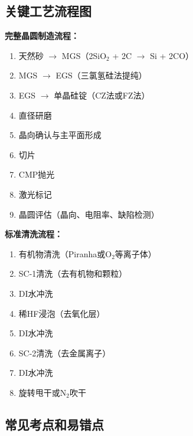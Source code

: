 \documentclass[UTF8,12pt,a4paper]{ctexart}
\begin{document}
\subsection{关键工艺流程图}

\textbf{完整晶圆制造流程：}
\begin{enumerate}
    \item 天然砂 $\rightarrow$ MGS（2SiO$_2$ + 2C $\rightarrow$ Si + 2CO）
    \item MGS $\rightarrow$ EGS（三氯氢硅法提纯）
    \item EGS $\rightarrow$ 单晶硅锭（CZ法或FZ法）
    \item 直径研磨
    \item 晶向确认与主平面形成
    \item 切片
    \item CMP抛光
    \item 激光标记
    \item 晶圆评估（晶向、电阻率、缺陷检测）
\end{enumerate}

\textbf{标准清洗流程：}
\begin{enumerate}
    \item 有机物清洗（Piranha或O$_2$等离子体）
    \item SC-1清洗（去有机物和颗粒）
    \item DI水冲洗
    \item 稀HF浸泡（去氧化层）
    \item DI水冲洗
    \item SC-2清洗（去金属离子）
    \item DI水冲洗
    \item 旋转甩干或N$_2$吹干
\end{enumerate}

\subsection{常见考点和易错点}
\end{document}
